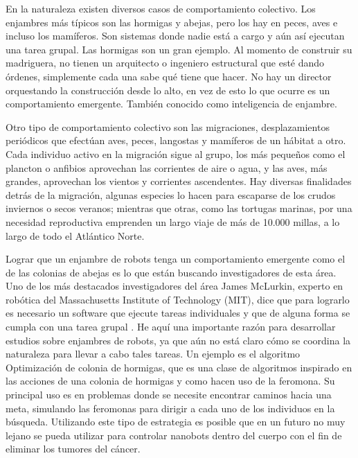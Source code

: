 En la naturaleza existen diversos casos de comportamiento colectivo. Los enjambres más típicos son las hormigas y abejas, pero los hay en peces, aves e incluso los mamíferos. Son sistemas donde nadie está a cargo y aún así ejecutan una tarea grupal. Las hormigas son un gran ejemplo. Al momento de construir su madriguera, no tienen un arquitecto o ingeniero estructural que esté dando órdenes, simplemente cada una sabe qué tiene que hacer. No hay un director orquestando la construcción desde lo alto, en vez de esto lo que ocurre es un comportamiento emergente. También conocido como inteligencia de enjambre\cite{bonabeau1999swarm}.

Otro tipo de comportamiento colectivo son las migraciones, desplazamientos periódicos que efectúan aves, peces, langostas y mamíferos de un hábitat a otro. Cada individuo activo en la migración sigue al grupo, los más pequeños como el plancton o anfibios aprovechan las corrientes de aire o agua, y las aves, más grandes, aprovechan los vientos y corrientes ascendentes. Hay diversas finalidades detrás de la migración, algunas especies lo hacen para escaparse de los crudos inviernos o secos veranos; mientras que otras, como las tortugas marinas, por una necesidad reproductiva emprenden un largo viaje de más de 10.000 millas, a lo largo de todo el Atlántico Norte.

Lograr que un enjambre de robots tenga un comportamiento emergente como el de las colonias de abejas es lo que están buscando investigadores de esta área. Uno de los más destacados investigadores del área James McLurkin, experto en robótica del Massachusetts Institute of Technology (MIT), dice que para lograrlo es necesario un software que ejecute tareas individuales y que de alguna forma se cumpla con una tarea grupal \cite{mclurkin2007distributed}. He aquí una importante razón para desarrollar estudios sobre enjambres de robots, ya que aún no está claro cómo se coordina la naturaleza para llevar a cabo tales tareas. Un ejemplo es el algoritmo Optimización de colonia de hormigas, que es una clase de algoritmos inspirado en las acciones de una colonia de hormigas y como hacen uso de la feromona. Su principal uso es en problemas donde se necesite encontrar caminos hacia una meta, simulando las feromonas para dirigir a cada uno de los individuos en la búsqueda. Utilizando este tipo de estrategia es posible que en un futuro no muy lejano se pueda utilizar para controlar nanobots dentro del cuerpo con el fin de eliminar los tumores del cáncer.

